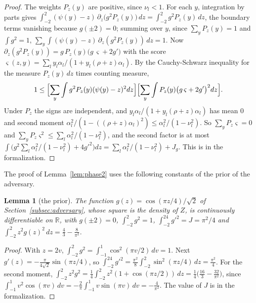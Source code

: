 \documentclass[12pt]{amsart}
\newtheorem{lemma}[theorem]{Lemma}
\theoremstyle{definition}
\numberwithin{equation}{section}
\newcommand{\R}{\mathbb{R}}
\newcommand{\leanmap}[1]{\ignorespaces}
\begin{document}
\begin{proof}
The weights $P_z(y)$ are positive, since $\nu_l<1$. For each $y$, integration by parts gives $\int_{-2}^2(\psi(y)-z)\,\partial_z\bigl(g^2P_z(y)\bigr)\,dz=\int_{-2}^2g^2P_z(y)\,dz$, the boundary terms vanishing because $g(\pm2)=0$; summing over $y$, since $\sum_yP_z(y)=1$ and $\int g^2=1$, $\sum_y\int(\psi(y)-z)\,\partial_z(g^2P_z(y))\,dz=1$. Now $\partial_z(g^2P_z(y))=g\,P_z(y)\bigl(g\,\varsigma+2g'\bigr)$ with the score $\varsigma(z,y)=\sum_ly_l\alpha_l/(1+y_l(\rho+z)\alpha_l)$. By the Cauchy-Schwarz inequality for the measure $P_z(y)\,dz$ times counting measure,
\[
1\le\Bigl[\sum_y\int g^2P_z(y)(\psi(y)-z)^2dz\Bigr]\Bigl[\sum_y\int P_z(y)\bigl(g\,\varsigma+2g'\bigr)^2dz\Bigr].
\]
Under $P_z$ the signs are independent, and $y_l\alpha_l/(1+y_l(\rho+z)\alpha_l)$ has mean $0$ and second moment $\alpha_l^2/(1-((\rho+z)\alpha_l)^2)\le\alpha_l^2/(1-\nu_l^2)$. So $\sum_yP_z\varsigma=0$ and $\sum_yP_z\varsigma^2\le\sum_l\alpha_l^2/(1-\nu_l^2)$, and the second factor is at most $\int\bigl(g^2\sum_l\alpha_l^2/(1-\nu_l^2)+4g'^2\bigr)dz=\sum_l\alpha_l^2/(1-\nu_l^2)+J_g$. This is  in the formalization.
\end{proof}

The proof of Lemma~\ref{lem:phase2} uses the following constants of the prior of the adversary.

\begin{lemma}[the prior]\label{lem:prior}
\leanmap{RegretKappa.LowerSharp.integral_gP_deriv_sq, RegretKappa.LowerSharp.integral_gP_sq,
  RegretKappa.LowerSharp.integral_sq_gP_sq, RegretKappa.LowerSharp.gP_two, RegretKappa.LowerSharp.gP_neg_two}
The function $g(z)=\cos(\pi z/4)/\sqrt2$ of Section~\ref{subsec:adversary}, whose square is the density of $Z$, is continuously differentiable on $\R$, with $g(\pm2)=0$, $\int_{-2}^2g^2=1$, $\int_{-2}^24g'^2=J=\pi^2/4$ and $\int_{-2}^2z^2g(z)^2\,dz=\frac43-\frac8{\pi^2}$.
\end{lemma}

\begin{proof}
With $z=2v$, $\int_{-2}^2g^2=\int_{-1}^1\cos^2(\pi v/2)\,dv=1$. Next $g'(z)=-\frac\pi{4\sqrt2}\sin(\pi z/4)$, so $\int_{-2}^24g'^2=\frac{\pi^2}8\int_{-2}^2\sin^2(\pi z/4)\,dz=\frac{\pi^2}4$. For the second moment, $\int_{-2}^2z^2g^2=\frac14\int_{-2}^2z^2(1+\cos(\pi z/2))\,dz=\frac14\bigl(\frac{16}3-\frac{32}{\pi^2}\bigr)$, since $\int_{-1}^1v^2\cos(\pi v)\,dv=-\frac2\pi\int_{-1}^1v\sin(\pi v)\,dv=-\frac4{\pi^2}$. The value of $J$ is  in the formalization.
\end{proof}
\end{document}
